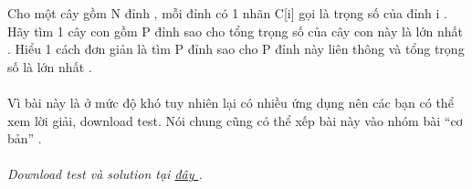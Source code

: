 Cho một cây gồm N đỉnh , mỗi đỉnh có 1 nhãn C[i] gọi là trọng số của đỉnh i . Hãy tìm 1 cây con gồm P đỉnh sao cho tổng trọng số của cây con này là lớn nhất . Hiểu 1 cách đơn giản là tìm P đỉnh sao cho P đỉnh này liên thông và tổng trọng số là lớn nhất .   
\\
\\       Vì bài này là ở mức độ khó tuy nhiên lại có nhiều ứng dụng nên các bạn có thể xem lời giải, download test. Nói chung cũng có thể xếp bài này vào nhóm bài “cơ bản” .      
\\
\\\textit{    Download test và solution tại    \href{http://vn.spoj.pl/content/ptree.rar}{     đây    }    .   }

\
